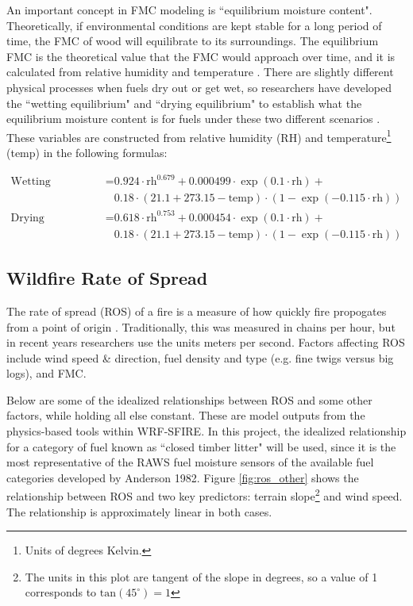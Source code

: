 \documentclass[11pt]{article}%
\begin{document}
An important concept in FMC modeling is ``equilibrium moisture content". Theoretically, if environmental conditions are kept stable for a long period of time, the FMC of wood will equilibrate to its surroundings. The equilibrium FMC is the theoretical value that the FMC would approach over time, and it is calculated from relative humidity and temperature \cite{Mitchell-2018-CEM}. There are slightly different physical processes when fuels dry out or get wet, so researchers have developed the ``wetting equilibrium" and ``drying equilibrium" to establish what the equilibrium moisture content is for fuels under these two different scenarios \cite{Mandel-2014-RAA}. These variables are constructed from relative humidity (RH) and temperature\footnote{Units of degrees Kelvin.} (temp) in the following formulas:



\begin{equation}
\begin{split}
\text{Wetting Equilibrium} = &0.924\cdot\text{rh}^{0.679} + 0.000499\cdot\exp(0.1\cdot\text{rh}) + \\ &0.18\cdot(21.1 + 273.15 - \text{temp})\cdot(1 - \exp(-0.115\cdot\text{rh})) \\
\text{Drying Equilibrium} = &0.618\cdot\text{rh}^{0.753} + 0.000454\cdot\exp(0.1\cdot\text{rh}) + \\ &0.18\cdot(21.1 + 273.15 - \text{temp})\cdot(1 - \exp(-0.115\cdot\text{rh}))
\end{split}
\end{equation}

\subsection{Wildfire Rate of Spread}

The rate of spread (ROS) of a fire is a measure of how quickly fire propogates from a point of origin \cite{NFSC}. Traditionally, this was measured in chains per hour, but in recent years researchers use the units meters per second. Factors affecting ROS include wind speed \& direction, fuel density and type (e.g. fine twigs versus big logs), and FMC. 

Below are some of the idealized relationships between ROS and some other factors, while holding all else constant. These are model outputs from the physics-based tools within WRF-SFIRE. In this project, the idealized relationship for a category of fuel known as ``closed timber litter" will be used, since it is the most representative of the RAWS fuel moisture sensors of the available fuel categories developed by Anderson 1982. \cite{NIFC-Fuels} Figure \ref{fig:ros_other} shows the relationship between ROS and two key predictors: terrain slope\footnote{The units in this plot are tangent of the slope in degrees, so a value of 1 corresponds to $\text{tan} (45^\circ) = 1$} and wind speed. \cite{openwfm_fuels} The relationship is approximately linear in both cases.
\end{document}
